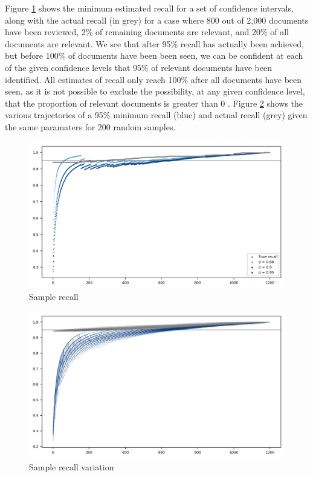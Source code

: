 \documentclass{bmcart}
\begin{document}
	Figure \ref{sample-recall} shows the minimum estimated recall for a set of confidence intervals, along with the actual recall (in grey) for a case where 800 out of 2,000 documents have been reviewed, 2\% of remaining documents are relevant, and 20\% of all documents are relevant. 
	We see that after 95\% recall has actually been achieved, but before 100\% of documents have been been seen, we can be confident at each of the given confidence levels that 95\% of relevant documents have been identified. 
	All estimates of recall only reach 100\% after all documents have been seen, as it is not possible to exclude the possibility, at any given confidence level, that the proportion of relevant documents is greater than 0 . 
	Figure \ref{sample-recall-variation} shows the various trajectories of a 95\% minimum recall (blue) and actual recall (grey) given the same paramaters for 200 random samples.

	\begin{figure}
		\includegraphics[width=\linewidth]{../images/sample_recall}
		\caption{Sample recall}
		\label{sample-recall}
	\end{figure}	

	\begin{figure}
		\includegraphics[width=\linewidth]{../images/sample_recall_2}
		\caption{Sample recall variation}
		\label{sample-recall-variation}
	\end{figure}	
\end{document}
